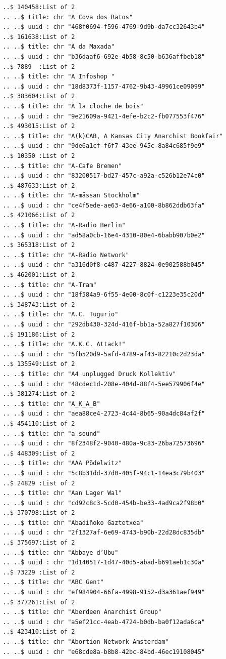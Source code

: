 \documentclass[
  letterpaper,
  DIV=11,
  numbers=noendperiod]{scrartcl}
\begin{document}
\begin{verbatim}
  ..$ 140458:List of 2
  .. ..$ title: chr "A Cova dos Ratos"
  .. ..$ uuid : chr "468f0694-f596-4769-9d9b-da7cc32643b4"
  ..$ 161638:List of 2
  .. ..$ title: chr "À da Maxada"
  .. ..$ uuid : chr "b36daaf6-692e-4b58-8c50-b636affbeb18"
  ..$ 7889  :List of 2
  .. ..$ title: chr "A Infoshop "
  .. ..$ uuid : chr "18d8373f-1157-4762-9b43-49961ce09099"
  ..$ 383604:List of 2
  .. ..$ title: chr "À la cloche de bois"
  .. ..$ uuid : chr "9e21609a-9421-4efe-b2c2-fb077553f476"
  ..$ 493015:List of 2
  .. ..$ title: chr "A(k)CAB, A Kansas City Anarchist Bookfair"
  .. ..$ uuid : chr "9de6a1cf-f6f7-43ee-945c-8a84c685f9e9"
  ..$ 10350 :List of 2
  .. ..$ title: chr "A-Cafe Bremen"
  .. ..$ uuid : chr "83200517-bd27-457c-a92a-c526b12e74c0"
  ..$ 487633:List of 2
  .. ..$ title: chr "A-mässan Stockholm"
  .. ..$ uuid : chr "ce4f5ede-ae63-4e66-a100-8b862ddb63fa"
  ..$ 421066:List of 2
  .. ..$ title: chr "A-Radio Berlin"
  .. ..$ uuid : chr "ad58a0cb-16e4-4310-80e4-6babb907b0e2"
  ..$ 365318:List of 2
  .. ..$ title: chr "A-Radio Network"
  .. ..$ uuid : chr "a316d0f8-c487-4227-8824-0e902588b045"
  ..$ 462001:List of 2
  .. ..$ title: chr "A-Tram"
  .. ..$ uuid : chr "18f584a9-6f55-4e00-8c0f-c1223e35c20d"
  ..$ 348743:List of 2
  .. ..$ title: chr "A.C. Tugurio"
  .. ..$ uuid : chr "292db430-324d-416f-bb1a-52a827f10306"
  ..$ 191186:List of 2
  .. ..$ title: chr "A.K.C. Attack!"
  .. ..$ uuid : chr "5fb520d9-5afd-4789-af43-82210c2d23da"
  ..$ 135549:List of 2
  .. ..$ title: chr "A4 unplugged Druck Kollektiv"
  .. ..$ uuid : chr "48cdec1d-208e-404d-88f4-5ee579906f4e"
  ..$ 381274:List of 2
  .. ..$ title: chr "A_K_A_B"
  .. ..$ uuid : chr "aea88ce4-2723-4c44-8b65-90a4dc84af2f"
  ..$ 454110:List of 2
  .. ..$ title: chr "a_sound"
  .. ..$ uuid : chr "8f2348f2-9040-480a-9c83-26ba72573696"
  ..$ 448309:List of 2
  .. ..$ title: chr "AAA Pödelwitz"
  .. ..$ uuid : chr "5c8b31dd-37d0-405f-94c1-14ea3c79b403"
  ..$ 24829 :List of 2
  .. ..$ title: chr "Aan Lager Wal"
  .. ..$ uuid : chr "cd92c8c3-5cd0-454b-be33-4ad9ca2f98b0"
  ..$ 370798:List of 2
  .. ..$ title: chr "Abadiñoko Gaztetxea"
  .. ..$ uuid : chr "2f1327af-6e69-4743-b90b-22d28dc835db"
  ..$ 375697:List of 2
  .. ..$ title: chr "Abbaye d’Ubu"
  .. ..$ uuid : chr "1d140517-1d47-40d5-abad-b691aeb1c30a"
  ..$ 73229 :List of 2
  .. ..$ title: chr "ABC Gent"
  .. ..$ uuid : chr "ef984904-66fa-4998-9152-d3a361aef949"
  ..$ 377261:List of 2
  .. ..$ title: chr "Aberdeen Anarchist Group"
  .. ..$ uuid : chr "a5ef21cc-4eab-4724-b0db-ba0f12ada6ca"
  ..$ 423410:List of 2
  .. ..$ title: chr "Abortion Network Amsterdam"
  .. ..$ uuid : chr "e68cde8a-b8b8-42bc-84bd-46ec19108045"

\end{verbatim}
\end{document}
